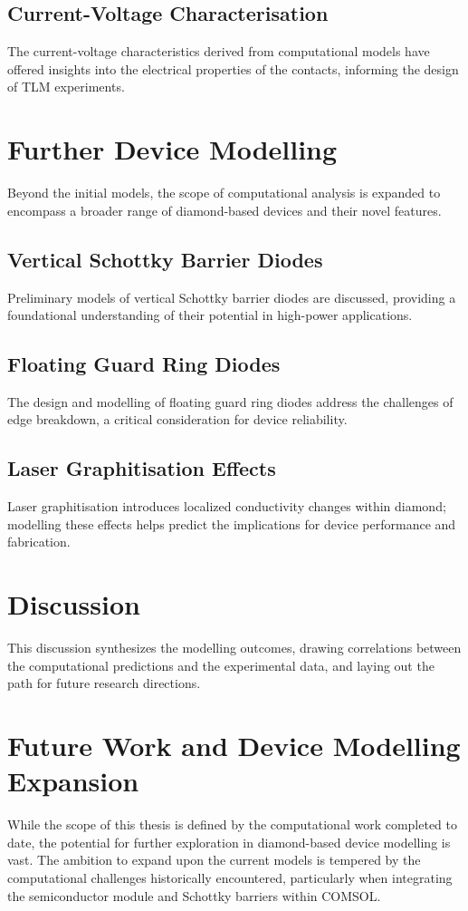 \subsection{Current-Voltage Characterisation}
The current-voltage characteristics derived from computational models have offered insights into the electrical properties of the contacts, informing the design of TLM experiments.

\section{Further Device Modelling}
Beyond the initial models, the scope of computational analysis is expanded to encompass a broader range of diamond-based devices and their novel features.

\subsection{Vertical Schottky Barrier Diodes}
Preliminary models of vertical Schottky barrier diodes are discussed, providing a foundational understanding of their potential in high-power applications.

\subsection{Floating Guard Ring Diodes}
The design and modelling of floating guard ring diodes address the challenges of edge breakdown, a critical consideration for device reliability.

\subsection{Laser Graphitisation Effects}
Laser graphitisation introduces localized conductivity changes within diamond; modelling these effects helps predict the implications for device performance and fabrication.

\section{Discussion}
This discussion synthesizes the modelling outcomes, drawing correlations between the computational predictions and the experimental data, and laying out the path for future research directions.

\section{Future Work and Device Modelling Expansion}
While the scope of this thesis is defined by the computational work completed to date, the potential for further exploration in diamond-based device modelling is vast. The ambition to expand upon the current models is tempered by the computational challenges historically encountered, particularly when integrating the semiconductor module and Schottky barriers within COMSOL.

